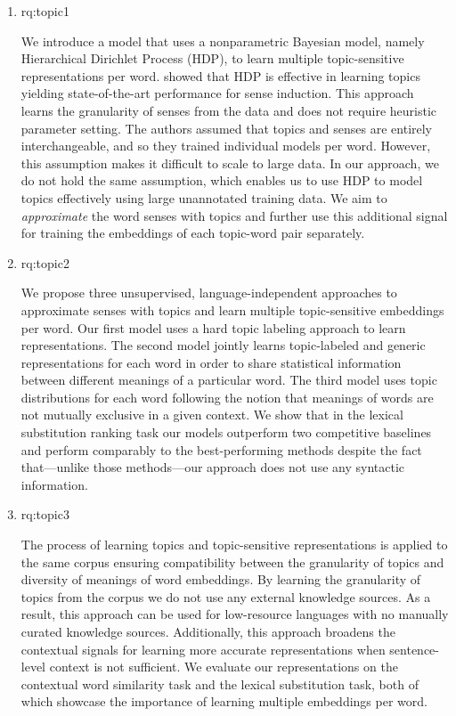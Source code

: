 \begin{enumerate}[label=\textbf{RQ1.\arabic* },wide = 0pt, leftmargin=2em]
\setlength\itemsep{1em}
 \setcounter{enumi}{0}
\item \acl{rq:topic1}

\medskip

\noindent We introduce a model that uses a nonparametric Bayesian model, namely Hierarchical Dirichlet Process (HDP), to learn multiple topic-sensitive representations per word. 
\citet{yao2011nonparametric} showed that HDP is effective in learning topics yielding state-of-the-art performance for sense induction. This approach learns the granularity of senses from the data and does not require heuristic parameter setting. 
The authors assumed that topics and senses are entirely interchangeable, and so they trained individual models per word.
However, this assumption makes it difficult to scale to large data. 
In our approach, we do not hold the same assumption, which enables us to use HDP to model topics effectively using large unannotated training data. 
We aim to \textit{approximate} the word senses with topics and further use this additional signal for training the embeddings of each topic-word pair separately. 

\item \acl{rq:topic2}

\medskip

\noindent We propose three unsupervised, language-independent approaches to approximate senses with topics and learn multiple topic-sensitive embeddings per word.
Our first model uses a hard topic labeling approach to learn representations. The second model jointly learns topic-labeled and generic representations for each word in order to share statistical information between different meanings of a particular word. The third model uses topic distributions for each word following the notion that meanings of words are not mutually exclusive in a given context.
We show that in the lexical substitution ranking task \citep{mccarthy2007semeval} 
our models outperform two competitive baselines and perform comparably to the best-performing methods despite the fact that---unlike those methods---our approach does not use any syntactic information. 


\item \acl{rq:topic3}

\medskip

\noindent The process of learning topics and topic-sensitive representations is applied to the same corpus ensuring compatibility between the granularity of topics and diversity of meanings of word embeddings. 
By learning the granularity of topics from the corpus we do not use any external knowledge sources.
As a result, this approach can be used for low-resource languages with no manually curated knowledge sources. 
Additionally, this approach broadens the contextual signals for learning more accurate representations when sentence-level context is not sufficient. 
We evaluate our representations on the contextual word similarity task and the lexical substitution task, both of which showcase the importance of learning multiple embeddings per word. 

\end{enumerate}


